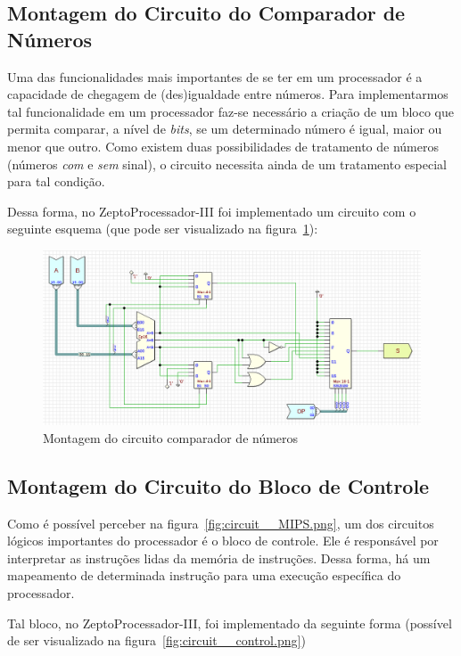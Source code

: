 \documentclass[12pt]{article}
\begin{document}
\subsection{Montagem do Circuito do Comparador de Números}\label{sec:2.5}

Uma das funcionalidades mais importantes de se ter em um processador é a
capacidade de chegagem de (des)igualdade entre números. Para implementarmos tal
funcionalidade em um processador faz-se necessário a criação de um bloco que
permita comparar, a nível de \emph{bits}, se um determinado número é igual,
maior ou menor que outro. Como existem duas possibilidades de tratamento de
números (números \emph{com} e \emph{sem} sinal), o circuito necessita ainda de
um tratamento especial para tal condição.

Dessa forma, no ZeptoProcessador-III foi implementado um circuito com o seguinte
esquema (que pode ser visualizado na figura~\ref{fig:circuit__comparator.png}):

\begin{figure}[H]
    \centering
    \includegraphics[width=.9\textwidth]{Projeto/images/circuit__comparator.png}
    \caption{Montagem do circuito comparador de números}\label{fig:circuit__comparator.png}
\end{figure}

\subsection{Montagem do Circuito do Bloco de Controle}\label{sec:2.6}

Como é possível perceber na figura~\ref{fig:circuit__MIPS.png}, um dos circuitos
lógicos importantes do processador é o bloco de controle. Ele é responsável por
interpretar as instruções lidas da memória de instruções. Dessa forma, há um
mapeamento de determinada instrução para uma execução específica do processador.

Tal bloco, no ZeptoProcessador-III, foi implementado da seguinte forma (possível
de ser visualizado na figura~\ref{fig:circuit__control.png})
\end{document}
